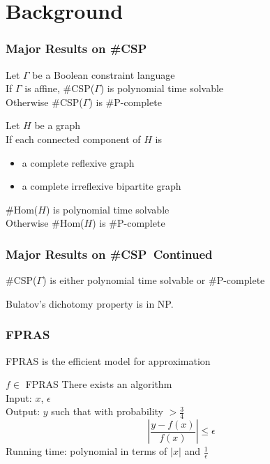 \documentclass[a4paper,handout]{beamer}
\newcommand{\ccsp}{\#CSP}
\newcommand{\chom}{\#Hom}
\newcommand{\cpc}{\#P-complete}
\newcommand{\oneoeps}{\frac{1}{\epsilon}}
\newcommand{\eps}{\epsilon}
\theoremstyle{definition}
\begin{document}
\section{Background}

\begin{frame}
\frametitle{Major Results on \ccsp}
\begin{theorem} 
Let \(\Gamma\) be a \textcolor{mygreen}{Boolean} constraint language\\
If \(\Gamma\) is \textcolor{mygreen}{affine}, \ccsp(\(\Gamma\)) is polynomial time solvable\\
Otherwise \ccsp(\(\Gamma\)) is \cpc
\end{theorem}

\pause

\begin{theorem}  
Let \(H\) be a graph\\
If each connected component of \(H\) is 
\begin{itemize}
\item a complete reflexive graph
\item a complete irreflexive bipartite graph
\end{itemize}
\chom(\(H\)) is polynomial time solvable\\
Otherwise \chom(\(H\)) is \cpc
\end{theorem}
\end{frame}

\begin{frame}
\frametitle{Major Results on \ccsp\ Continued}
\begin{theorem} [Bulatov 2008]
\ccsp(\(\Gamma\)) is either polynomial time solvable or \cpc
\end{theorem}
\pause

\begin{theorem}
Bulatov's dichotomy property is in NP.
\end{theorem}
\end{frame}

\begin{frame}
\frametitle{FPRAS}
FPRAS is the efficient model for approximation
\begin{block} {\(f \in \) FPRAS}
There exists an algorithm \\
Input: \(x\), \(\eps\) \\
Output: \(y\) such that with probability \( > \frac{3}{4}\)
\[\left|\frac{y-f(x)}{f(x)}\right| \le \eps\]
Running time: polynomial in terms of \(|x|\) and \(\oneoeps\)
\end{block}
\end{frame}
\end{document}
